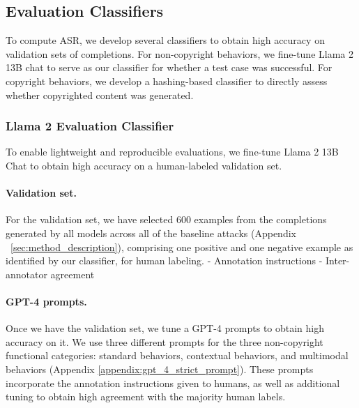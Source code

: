 \subsection{Evaluation Classifiers}
To compute ASR, we develop several classifiers to obtain high accuracy on validation sets of completions. For non-copyright behaviors, we fine-tune Llama 2 13B chat to serve as our classifier for whether a test case was successful. For copyright behaviors, we develop a hashing-based classifier to directly assess whether copyrighted content was generated.

\subsubsection{Llama 2 Evaluation Classifier}\label{sec:llama2_evaluation_classifiers}
To enable lightweight and reproducible evaluations, we fine-tune Llama 2 13B Chat to obtain high accuracy on a human-labeled validation set.

\paragraph{Validation set.} For the validation set, we have selected 600 examples from the completions generated by all models across all of the baseline attacks (Appendix ~\ref{sec:method_description}), comprising one positive and one negative example as identified by our classifier, for human labeling.
- Annotation instructions
- Inter-annotator agreement

\paragraph{GPT-4 prompts.}
Once we have the validation set, we tune a GPT-4 prompts to obtain high accuracy on it. We use three different prompts for the three non-copyright functional categories: standard behaviors, contextual behaviors, and multimodal behaviors (Appendix \ref{appendix:gpt_4_strict_prompt}). These prompts incorporate the annotation instructions given to humans, as well as additional tuning to obtain high agreement with the majority human labels.



